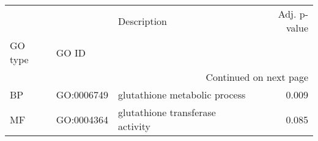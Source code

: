 \begin{longtable}{lllr}
\toprule
   &            &                       Description &  Adj. p-value \\
GO type & GO ID &                                   &               \\
\midrule
\endhead
\midrule
\multicolumn{4}{r}{{Continued on next page}} \\
\midrule
\endfoot

\bottomrule
\endlastfoot
BP & GO:0006749 &     glutathione metabolic process &         0.009 \\
MF & GO:0004364 &  glutathione transferase activity &         0.085 \\
\end{longtable}

